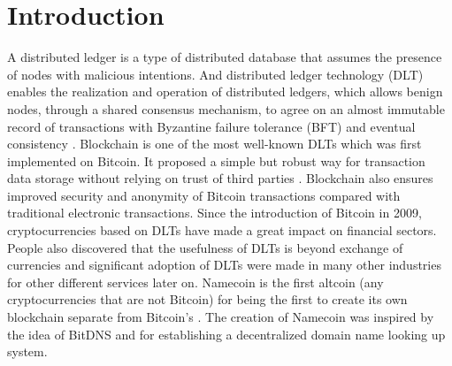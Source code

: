 \section{Introduction}
\label{sec:introduction}

A distributed ledger is a type of distributed database that assumes the presence of nodes with malicious intentions.
And distributed ledger technology (DLT) enables the realization and operation of distributed ledgers,
which allows benign nodes, through a shared consensus mechanism, to agree on an almost immutable record of transactions with Byzantine failure tolerance (BFT) and eventual consistency \cite{Sunyaev2020}.
Blockchain is one of the most well-known DLTs which was first implemented on Bitcoin. It proposed a simple but robust way for transaction data storage without relying on trust of third parties \cite{nakamoto2008peer}.
Blockchain also ensures improved security and anonymity of Bitcoin transactions compared with traditional electronic transactions.
Since the introduction of Bitcoin in 2009, cryptocurrencies based on DLTs have made a great impact on financial sectors. People also discovered that the usefulness of DLTs is beyond exchange of currencies and
significant adoption of DLTs were made in many other industries for other different services later on. Namecoin is the first altcoin (any cryptocurrencies that are not Bitcoin) for being the first to create its own blockchain separate from Bitcoin's \cite{kalodner2015empirical}.
The creation of Namecoin was inspired by the idea of BitDNS \cite{merited2010bitdns} and for establishing a decentralized domain name looking up system.
